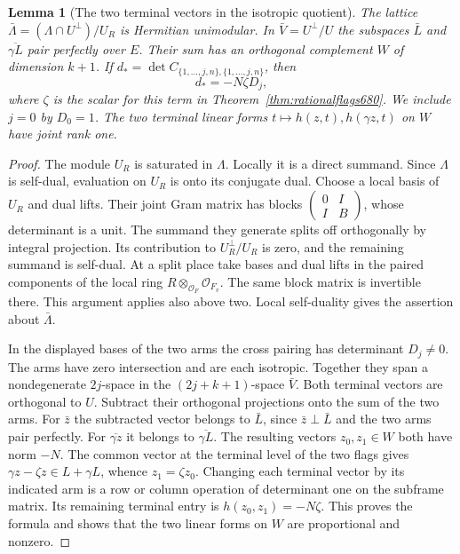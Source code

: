 \documentclass[a4paper,11pt]{article}
\newtheorem{lemma}[proposition]{Lemma}
\theoremstyle{definition}
\theoremstyle{remark}
\numberwithin{equation}{section}
\begin{document}
\begin{lemma}[The two terminal vectors in the isotropic quotient]
\leavevmode\label{lem:quotientframe689}
The lattice \(\bar\Lambda=(\Lambda\cap U^\perp)/U_R\) is Hermitian
unimodular. In \(\bar V=U^\perp/U\) the subspaces \(\bar L\) and
\(\overline{\gamma L}\) pair perfectly over \(E\). Their sum has
an orthogonal complement \(W\) of dimension \(k+1\).
If \(d_*=\det C_{\{1,\ldots,j,n\},\{1,\ldots,j,n\}}\), then
\[
                        d_*=-N\zeta D_j ,
\]
where \(\zeta\) is the scalar for this term in
Theorem~\ref{thm:rationalflags680}. We include \(j=0\) by
\(D_0=1\). The two terminal linear forms
\(t\mapsto h(z,t),h(\gamma z,t)\) on \(W\) have joint rank one.
\end{lemma}
\begin{proof}
The module \(U_R\) is saturated in \(\Lambda\). Locally it is
a direct summand. Since \(\Lambda\) is self-dual, evaluation
on \(U_R\) is onto its conjugate dual. Choose a local basis
of \(U_R\) and dual lifts. Their joint Gram matrix has blocks
\(\left(\begin{smallmatrix}0&I\\ I&B\end{smallmatrix}\right)\),
whose determinant is a unit. The summand they generate splits
off orthogonally by integral projection. Its contribution to
\(U_R^\perp/U_R\) is zero, and the remaining summand is
self-dual. At a split place take bases and dual lifts in the
paired components of the local ring \(R\otimes_{\mathcal O_F}
\mathcal O_{F_v}\). The same block matrix is invertible there.
This argument applies also above two. Local self-duality gives
the assertion about \(\bar\Lambda\).

In the displayed bases of the two arms the cross pairing has
determinant \(D_j\ne0\). The arms have zero intersection and
are each isotropic. Together they span a nondegenerate
\(2j\)-space in the \((2j+k+1)\)-space \(\bar V\).
Both terminal vectors are orthogonal to \(U\). Subtract their
orthogonal projections onto the sum of the two arms.
For \(\bar z\) the subtracted vector belongs to \(\bar L\),
since \(\bar z\perp\bar L\) and the two arms pair perfectly.
For \(\overline{\gamma z}\) it belongs to \(\overline{\gamma L}\).
The resulting vectors \(z_0,z_1\in W\) both have norm \(-N\).
The common vector at the terminal level of the two flags gives
\(\gamma z-\zeta z\in L+\gamma L\), whence \(z_1=\zeta z_0\).
Changing each terminal vector by its indicated arm is a row
or column operation of determinant one on the subframe matrix.
Its remaining terminal entry is \(h(z_0,z_1)=-N\zeta\).
This proves the formula and shows that the two linear forms
on \(W\) are proportional and nonzero.
\end{proof}
\end{document}
